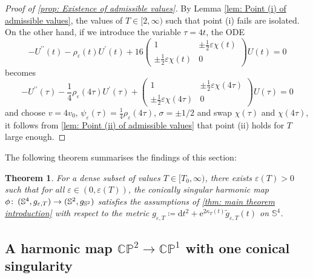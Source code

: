 \documentclass{article}
\numberwithin{equation}{section}        %
\theoremstyle{bfnote}
\newtheorem{thm}{Theorem}[section]          %
\theoremstyle{definition}
\theoremstyle{bfremark}
\newcommand{\col}{\colon \thinspace}        %
\newcommand{\Sp}{\mathbb{S}}                %
\newcommand{\diff}{\mathrm{d}}                      %
\begin{document}
\begin{proof}[Proof of \cref{prop: Existence of admissible values}]
    By Lemma \cref{lem: Point (i) of admissible values}, the values of $T \in [2,\infty)$ such that point (i) fails are isolated. On the other hand, if we introduce the variable $\tau = 4t$, the ODE
    \begin{equation*}
        - U^{\prime\prime}(t) - \rho_\varepsilon(t) U^\prime(t) + 16 \begin{pmatrix} 1 & \pm \frac{1}{2} \varepsilon \chi(t) \\ \pm\frac{1}{2} \varepsilon \chi(t) & 0 \end{pmatrix} U(t) = 0
    \end{equation*}
    becomes
    \begin{equation*}
        - U^{\prime\prime}(\tau) - \frac{1}{4}\rho_\varepsilon(4\tau) U^\prime(\tau) + \begin{pmatrix} 1 & \pm \frac{1}{2} \varepsilon \chi(4\tau) \\ \pm\frac{1}{2} \varepsilon \chi(4\tau) & 0 \end{pmatrix} U(\tau) = 0
    \end{equation*}
    and choose $v = 4v_0$, $\psi_{\varepsilon}(\tau) = \frac{1}{4}\rho_{\varepsilon}(4\tau)$, $\sigma = \pm 1/2$ and swap $\chi(\tau)$ and $\chi(4\tau)$, it follows from \cref{lem: Point (ii) of admissible values} that point (ii) holds for $T$ large enough.
\end{proof}

The following theorem summarises the findings of this section:

\begin{thm}
    For a dense subset of values $T \in [T_0,\infty)$, there exists $\varepsilon(T) > 0$ such that for all $\varepsilon \in (0,\varepsilon(T))$, the conically singular harmonic map $\phi \col (\Sp^4, g_{\varepsilon,T}) \to (\Sp^2,g_{\Sp^2})$ satisfies the assumptions of \cref{thm: main theorem introduction} with respect to the metric $g_{\varepsilon,T} \coloneqq \diff t^2 + \mathrm{e}^{2\kappa_T(t)} \widetilde{g}_{\varepsilon,T}(t)$ on $\Sp^4$.
\end{thm}


    \subsection{A harmonic map $\mathbb{CP}^2 \to \mathbb{CP}^1$ with one conical singularity}      \label{sec: map CP2 to CP1}
\end{document}
